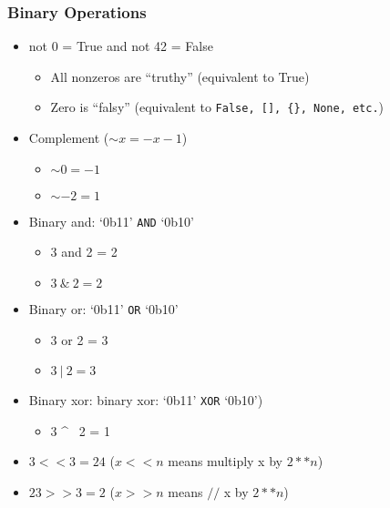 \documentclass{beamer}
\begin{document}
\begin{frame}
  \frametitle{Binary Operations}

  \begin{itemize}
  \item not 0 = True and not 42 = False
    \begin{itemize}
      \item All nonzeros are ``truthy'' (equivalent to True)
      \item Zero is ``falsy'' (equivalent to \texttt{False, [], \{\}, None, etc.})
    \end{itemize}
  \item Complement ($\sim x = -x -1$)
    \begin{itemize}
      \item $\sim 0 = -1$ 
      \item $\sim -2 = 1$ 
    \end{itemize}
  \item Binary and: `0b11' \texttt{AND} `0b10'
    \begin{itemize}
      \item 3 and 2 = 2
      \item $3 ~\&~ 2 = 2$
    \end{itemize}
  \item Binary or: `0b11' \texttt{OR} `0b10'
    \begin{itemize}
      \item 3 or 2 = 3 
      \item $3 ~|~ 2 = 3$
    \end{itemize}
  \item Binary xor: binary xor: `0b11' \texttt{XOR} `0b10')
    \begin{itemize}
      \item 3 \textasciicircum~ 2 = 1
    \end{itemize}
  \item $3 << 3 = 24$ ($x << n$ means multiply x by $2**n$)
  \item $23 >> 3 = 2$ ($x >> n$ means $//$ x by $2**n$)
  \end{itemize}
\end{frame}
\end{document}
